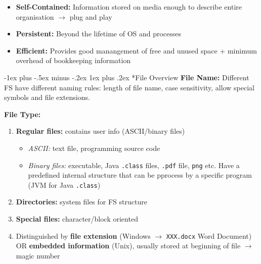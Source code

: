 \documentclass[10pt,landscape]{article}
\makeatletter
\renewcommand{\subsubsection}{\@startsection{subsubsection}{3}{0mm}%
                                {-1ex plus -.5ex minus -.2ex}%
                                {1ex plus .2ex}%
                                {\normalfont\small\bfseries}}
\makeatother
\begin{document}
\begin{multicols*}{3}
\begin{itemize}[topsep=0pt,noitemsep,wide=0pt, leftmargin=\dimexpr{} + 2\relax]
    \item \textbf{Self-Contained:} Information stored on media enough to describe entire organisation $\rightarrow$ plug and play
    \item \textbf{Persistent:} Beyond the lifetime of OS and processes
    \item \textbf{Efficient:} Provides good manangement of free and unused space + minimum overhead of bookkeeping information
\end{itemize}

\subsubsection*{File Overview}
\textbf{File Name:} Different FS have different naming rules: length of file name, case sensitivity, allow special symbols and file extensions.

\textbf{File Type:}
\begin{enumerate}[topsep=0pt,noitemsep,wide=0pt, leftmargin=\dimexpr\labelwidth + 2\labelsep\relax]
    \item \textbf{Regular files:} contains user info (ASCII/binary files)
    \begin{itemize}[topsep=0pt,noitemsep,wide=0pt, leftmargin=\dimexpr{} + 2\relax]
        \item \textit{ASCII:} text file, programming source code
        \item \textit{Binary files:} executable, Java \verb|.class| files, \verb|.pdf| file, \verb|png| etc. Have a predefined internal structure that can be pprocess by a specific program (JVM for Java \verb|.class|)
    \end{itemize}
    \item \textbf{Directories:} system files for FS structure
    \item \textbf{Special files:} character/block oriented
    \item Distinguished by \textbf{file extension} (Windows $\rightarrow$ \verb|XXX.docx| Word Document) OR \textbf{embedded information} (Unix),
    usually stored at beginning of file $\rightarrow$ magic number
\end{enumerate}


\end{multicols*}
\end{document}
